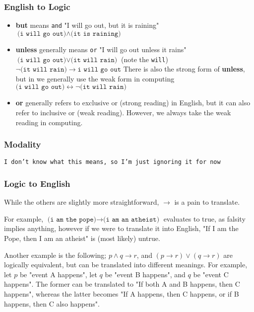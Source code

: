 \documentclass[a4paper, 12pt]{article}
\begin{document}
            \subsubsection*{English to Logic}
                \begin{itemize}
                    \itemsep0em
                    \item \textbf{but} means \texttt{and}
                        \subitem "I will go out, but it is raining" \hfill $\texttt{(i will go out)} \land \texttt{(it is raining)}$
                    \item \textbf{unless} generally means \texttt{or}
                        \subitem "I will go out unless it rains" \hfill $\texttt{(i will go out)} \lor \texttt{(it will rain)}$ (note the \texttt{will})
                        \subitem \hfill $\neg\texttt{(it will rain)} \rightarrow \texttt{i will go out}$
                        \subitem There is also the strong form of \textbf{unless}, but in we generally use the weak form in computing
                        \subitem \hfill $\texttt{(i will go out)} \leftrightarrow \neg\texttt{(it will rain)}$
                    \item \textbf{or} generally refers to exclusive or (strong reading) in English, but it can also refer to inclusive or (weak reading). However, we always take the weak reading in computing.
                \end{itemize}
            \subsubsection*{Modality}
                \texttt{I don't know what this means, so I'm just ignoring it for now}
            \subsubsection*{Logic to English}
                While the others are slightly more straightforward, $\rightarrow$ is a pain to translate.
                \smallskip

                For example, $\texttt{(i am the pope)} \rightarrow \texttt{(i am an atheist)}$ evaluates to true, as falsity implies anything, however if we were to translate it into English, "If I am the Pope, then I am an atheist" is (most likely) untrue.
                \smallskip

                Another example is the following; $p \land q \rightarrow r$, and $(p \rightarrow r) \lor (q \rightarrow r)$ are logically equivalent, but can be translated into different meanings. For example, let $p$ be "event A happens", let $q$ be "event B happens", and $q$ be "event C happens". The former can be translated to "If both A and B happens, then C happens", whereas the latter becomes "If A happens, then C happens, or if B happens, then C also happens".
\end{document}
